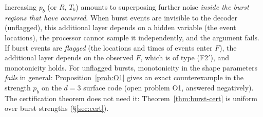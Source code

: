 \begin{remark}\label{rem:shape}
Increasing $p_b$ (or $R$, $T_b$) amounts to superposing further noise \emph{inside the burst regions that have occurred}. When burst events are invisible to the decoder (unflagged),
this additional layer depends on a hidden variable (the event locations), the processor cannot sample it independently, and the argument fails.
If burst events are \emph{flagged} (the locations and times of events enter $F$), the additional layer depends on the observed $F$, which is of type (F2$'$), and monotonicity holds.
For unflagged bursts, monotonicity in the shape parameters \emph{fails} in general: Proposition~\ref{prob:O1} gives an exact counterexample in the strength $p_b$ on the $d=3$ surface code (open problem O1, answered negatively).
The certification theorem does not need it: Theorem~\ref{thm:burst-cert} is uniform over burst strengths (\S\ref{sec:cert}).
\end{remark}
